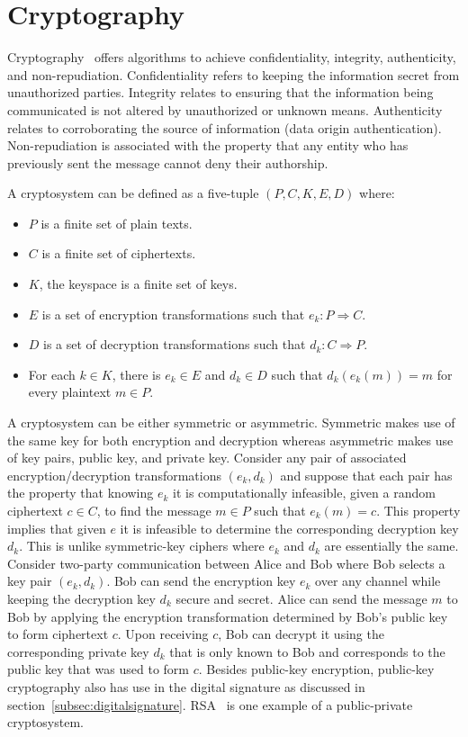 \section{Cryptography} \label{sec:cryptography}
Cryptography~\cite{katz1996handbook} offers algorithms to achieve
confidentiality, integrity, authenticity, and non-repudiation. Confidentiality
refers to keeping the information secret from unauthorized parties. Integrity
relates to ensuring that the information being communicated is not altered by
unauthorized or unknown means. Authenticity relates to corroborating the source
of information (data origin authentication). Non-repudiation is associated with
the property that any entity who has previously sent the message cannot deny
their authorship.  \par
A cryptosystem can be defined as a five-tuple $(P, C, K, E, D)$ where: 
\begin{itemize}
	\item $P$ is a finite set of plain texts.
	\item $C$ is a finite set of ciphertexts.
	\item $K$, the keyspace is a finite set of keys.
	\item $E$ is a set of encryption transformations such that $e_{k}:P \Rightarrow C$.
	\item $D$ is a set of decryption transformations such that $d_{k}:C \Rightarrow P$. 
	\item For each $k \in K$, there is $e_k \in E$ and $d_k \in D$ such that
		$d_k(e_k(m)) = m$ for every plaintext $m \in P$.
\end{itemize}
A cryptosystem can be either symmetric or asymmetric. Symmetric makes use of
the same key for both encryption and decryption whereas asymmetric makes use of
key pairs, public key, and private key. Consider any pair of associated
encryption/decryption transformations $(e_{k},d_{k})$ and suppose that each
pair has the property that knowing  $e_{k}$ it is computationally infeasible,
given a random ciphertext $c \in C$, to find the message $m \in P$ such that
$e_{k}(m) = c$. This property implies that given $e$ it is infeasible to
determine the corresponding decryption key $d_{k}$. This is unlike
symmetric-key ciphers where $e_{k}$ and $d_{k}$ are essentially the same.
Consider two-party communication between Alice and Bob where Bob selects a key
pair $(e_{k},d_{k})$. Bob can send the encryption key $e_{k}$ over any channel
while keeping the decryption key $d_{k}$ secure and secret. Alice can send the
message $m$ to Bob by applying the encryption transformation determined by
Bob's public key to form ciphertext $c$. Upon receiving $c$, Bob can decrypt it
using the corresponding private key $d_{k}$ that is only known to Bob and
corresponds to the public key that was used to form $c$. Besides public-key
encryption, public-key cryptography also has use in the digital signature as
discussed in section~\ref{subsec:digitalsignature}.
RSA~\cite{rivest1978method} is one example of a public-private cryptosystem.

